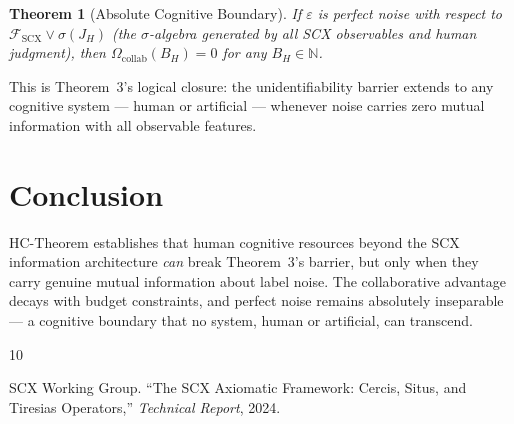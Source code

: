 \documentclass[12pt,a4paper]{article}
\newtheorem{theorem}{Theorem}[section]
\newcommand{\N}{\mathbb{N}}
\newcommand{\cF}{\mathcal{F}}
\begin{document}
\begin{theorem}[Absolute Cognitive Boundary]
\label{thm:absolute-boundary}
If $\varepsilon$ is perfect noise with respect to $\cF_{\mathrm{SCX}} \vee \sigma(J_H)$ (the $\sigma$-algebra generated by all SCX observables and human judgment), then $\Omega_{\mathrm{collab}}(B_H) = 0$ for any $B_H \in \N$.
\end{theorem}

This is Theorem~3's logical closure: the unidentifiability barrier extends to any cognitive system --- human or artificial --- whenever noise carries zero mutual information with all observable features.

\section{Conclusion}

HC-Theorem establishes that human cognitive resources beyond the SCX information architecture \emph{can} break Theorem~3's barrier, but only when they carry genuine mutual information about label noise. The collaborative advantage decays with budget constraints, and perfect noise remains absolutely inseparable --- a cognitive boundary that no system, human or artificial, can transcend.


\begin{thebibliography}{10}

SCX Working Group.
\newblock ``The \textsf{SCX} Axiomatic Framework: Cercis, Situs, and Tiresias Operators,''
\newblock \emph{Technical Report}, 2024.

\end{thebibliography}
\end{document}

